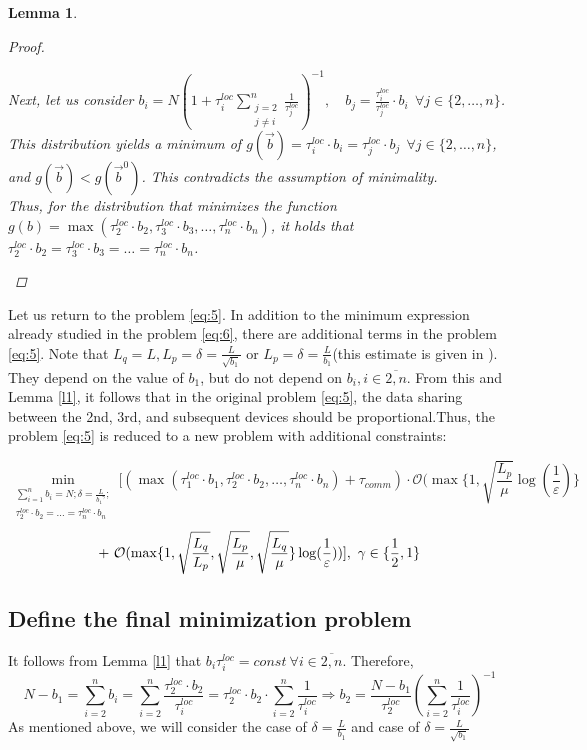 \documentclass{article}
\newtheorem{lemma}[theorem]{Lemma}
\begin{document}
\begin{lemma}
\begin{proof}
\begin{spacing}{1.3}
        Next, let us consider $b_i = N(1 + \tau_i^{loc}\sum\limits_{\substack{j = 2 \\ j \neq i}}^n \frac{1}{\tau_j^{loc}})^{-1}, \quad b_j = \frac {\tau_i^{loc}}{\tau_j^{loc}}\cdot b_i  ~~ \forall j \in \{2,\ldots,n\}$. 
        This distribution yields a minimum of $g(\overrightarrow{b}) = \tau_i^{loc}\cdot b_i = \tau_j^{loc}\cdot b_j ~~ \forall j \in \{2,\ldots,n\}$, and $g(\overrightarrow{b}) < g(\overrightarrow{b}^0)$. 
        This contradicts the assumption of minimality. 
        \\
        Thus, for the distribution that minimizes the function $g(b) = \max(\tau_2^{loc}\cdot b_2, \tau_3^{loc}\cdot b_3, \ldots, \tau_n^{loc}\cdot b_n)$, it holds that $\tau_2^{loc}\cdot b_2 = \tau_3^{loc}\cdot b_3 = \ldots = \tau_n^{loc}\cdot b_n$.
        \end{spacing}
    \end{proof}
\end{lemma}
Let us return to the problem \eqref{eq:5}. In addition to the minimum expression already studied in the problem \eqref{eq:6}, there are additional terms in the problem \eqref{eq:5}. Note that $L_q = L, L_p = \delta = \frac{L}{\sqrt{b_1}}$ or $L_p = \delta = \frac{L}{b_1}$(this estimate is given in \cite{kovalev2022optimal}).  They depend on the value of $b_1$, but do not depend on $b_i, i \in \overline{2, n}$. From this and Lemma \ref{l1}, it follows that in the original problem \eqref{eq:5}, the data sharing between the 2nd, 3rd, and subsequent devices should be proportional.Thus, the problem \eqref{eq:5} is reduced to a new problem with additional constraints:

\begin{equation}
    \label{eq:7}
    \min_{\substack{
    \sum\limits_{i = 1}^{n} b_i = N; \delta = \frac{L}{{b_1}^\gamma};\\
   \tau_2^{loc}\cdot b_2 = \ldots = \tau_n^{loc}\cdot b_n
  }} 
    [(\max(\tau_1^{loc}\cdot b_1, \tau_2^{loc}\cdot b_2, \ldots , \tau_n^{loc}\cdot b_n) + \tau_{comm}) \cdot \mathcal O(\max\{1, \sqrt{\frac{L_p}{\mu}}\log(\frac{1}{\varepsilon})\} 
\end{equation}
\begin{equation}
     \notag
     + ~
    \mathcal O(\max\{1,\sqrt{\frac{L_q}{L_p}}, \sqrt{\frac{L_p}{\mu}}, \sqrt{\frac{L_q}{\mu}}\}\log(\frac{1}{\varepsilon}))] ,  ~ \gamma \in \{\frac{1}{2}, 1\}
\end{equation}



\subsection{Define the final minimization problem}
It follows from Lemma \ref{l1} that $b_i \tau_i^{loc} = const ~ \forall i \in \overline{2, n}$.
Therefore, $$ N - b_1 = \sum\limits_{i = 2}^{n} b_i = \sum\limits_{i = 2}^{n} \frac{\tau_2^{loc}\cdot b_2}{\tau_i^{loc}} = \tau_2^{loc}\cdot b_2 \cdot \sum\limits_{i = 2}^{n} \frac{1}{\tau_i^{loc}} \Rightarrow
b_2 = \frac{N - b_1}{\tau_2 ^{loc}}(\sum\limits_{i = 2}^{n} \frac{1}{\tau_i^{loc}})^{-1}$$ 
As mentioned above, we will consider the case of $\delta = \frac{L}{b_1}$ and case of $\delta = \frac{L}{\sqrt{b_1}}$
\end{document}
